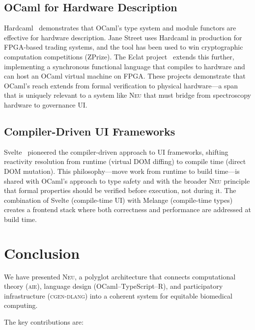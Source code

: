 \documentclass[11pt,letterpaper]{article}
\newcommand{\neu}{\textsc{Neu}}
\newcommand{\aie}{\textsc{aie}}
\newcommand{\cgen}{\textsc{cgen-dlang}}
\begin{document}
\subsection{OCaml for Hardware Description}

Hardcaml~\cite{hardcaml2023} demonstrates that OCaml's type system and module functors are effective for hardware description. Jane Street uses Hardcaml in production for FPGA-based trading systems, and the tool has been used to win cryptographic computation competitions (ZPrize). The Eclat project~\cite{eclat2023} extends this further, implementing a synchronous functional language that compiles to hardware and can host an OCaml virtual machine on FPGA. These projects demonstrate that OCaml's reach extends from formal verification to physical hardware---a span that is uniquely relevant to a system like \neu{} that must bridge from spectroscopy hardware to governance UI.

\subsection{Compiler-Driven UI Frameworks}

Svelte~\cite{svelte2019} pioneered the compiler-driven approach to UI frameworks, shifting reactivity resolution from runtime (virtual DOM diffing) to compile time (direct DOM mutation). This philosophy---move work from runtime to build time---is shared with OCaml's approach to type safety and with the broader \neu{} principle that formal properties should be verified before execution, not during it. The combination of Svelte (compile-time UI) with Melange (compile-time types) creates a frontend stack where both correctness and performance are addressed at build time.

\section{Conclusion}
\label{sec:conclusion}

We have presented \neu{}, a polyglot architecture that connects computational theory (\aie{}), language design (OCaml--TypeScript--R), and participatory infrastructure (\cgen{}) into a coherent system for equitable biomedical computing.

The key contributions are:
\end{document}
